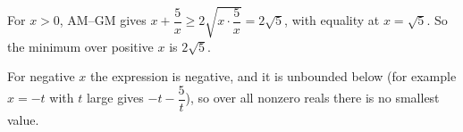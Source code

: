 For $x>0$, AM--GM gives $x+\dfrac{5}{x}\ge2\sqrt{x\cdot\dfrac{5}{x}}=2\sqrt5$, with equality at $x=\sqrt5$. So the minimum over positive $x$ is $\boxed{2\sqrt5}$.

For negative $x$ the expression is negative, and it is unbounded below (for example $x=-t$ with $t$ large gives $-t-\dfrac{5}{t}$), so over all nonzero reals there is no smallest value.
